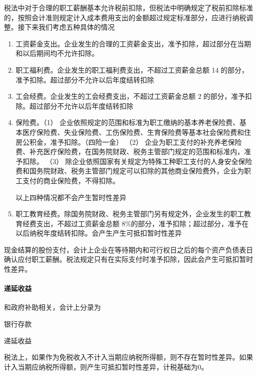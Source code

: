 \documentclass[UTF8,12pt]{ctexart}
\newenvironment{Dr}{%
	\begin{list}{}%
		{
			\setlength{\leftmargin}{2em}
			\setlength{\labelwidth}{2em}
			\setlength{\labelsep}{0pt}
			\setlength{\itemindent}{0pt}
			\setlength{\listparindent}{0pt}
			\setlength{\parsep}{0pt}
			\setlength{\topsep}{0pt}
		}
		\item[\textbf{借：}]
	}{%
	\end{list}
}
\newenvironment{Cr}{%
	\begin{list}{}%
		{
			\setlength{\leftmargin}{3em}
			\setlength{\labelwidth}{2em}
			\setlength{\labelsep}{0pt}
			\setlength{\itemindent}{0pt}
			\setlength{\listparindent}{0pt}
			\setlength{\parsep}{0pt}
			\setlength{\topsep}{0pt}
		}
		\item[\textbf{贷：}]
	}{%
	\end{list}
}
\numberwithin{equation}{section} %
\numberwithin{figure}{section}
\numberwithin{table}{section}
\begin{document}
	税法中对于合理的职工薪酬基本允许税前扣除，但税法中明确规定了税前扣除标准的，按照会计准则规定计入成本费用支出的金额超过规定标准部分，应进行纳税调整。接下来我们考虑五种具体的情况
	\begin{enumerate}
		\item 工资薪金支出。企业发生的合理的工资薪金支出，准予扣除，超过部分在当期和以后期间均不允许扣除。
		
		\item 职工福利费。企业发生的职工福利费支出，不超过工资薪金总额 14的部分，准予扣除。超过部分不允许以后年度结转扣除
		
		\item 工会经费。企业发生的工会经费支出，不超过工资薪金总额 2的部分，准予扣除。超过部分不允许以后年度结转扣除
		
		\item 保险费。（1）	企业依照规定的范围和标准为职工缴纳的基本养老保险费、基本医疗保险费、失业保险费、工伤保险费、生育保险费等基本社会保险费和住房公积金，准予扣除。（四险一金）
		（2）	企业为职工支付的补充养老保险费、补充医疗保险费，在国务院财政、税务主管部门规定的范围和标准内，准予扣除。
		（3）	除企业依照国家有关规定为特殊工种职工支付的人身安全保险费和国务院财政、税务主管部门规定可以扣除的其他商业保险费外，企业为职工支付的商业保险费，不得扣除。
		
		以上四种情况都不会产生暂时性差异
		
		\item 职工教育经费。除国务院财政、税务主管部门另有规定外，企业发生的职工教育经费支出，不超过工资薪金总额 8\%的部分，准予扣除；超过部分，准予在以后纳税年度结转扣除。会产生产生可抵扣暂时性差异
	\end{enumerate}
	
	现金结算的股份支付，会计上企业在等待期内和可行权日之后的每个资产负债表日确认应付职工薪酬。税法规定只有在实际支付时准予扣除，因此会产生可抵扣暂时性差异。
	
	\paragraph{递延收益}
	和政府补助相关，会计上分录为
	\begin{Dr}
		银行存款
	\end{Dr}
	\begin{Cr}
		递延收益
	\end{Cr}
	
	税法上，如果作为免税收入不计入当期应纳税所得额，则不存在暂时性差异。如果计入当期应纳税所得额，则产生可抵扣暂时性差异，计税基础为0。
	
\end{document}
